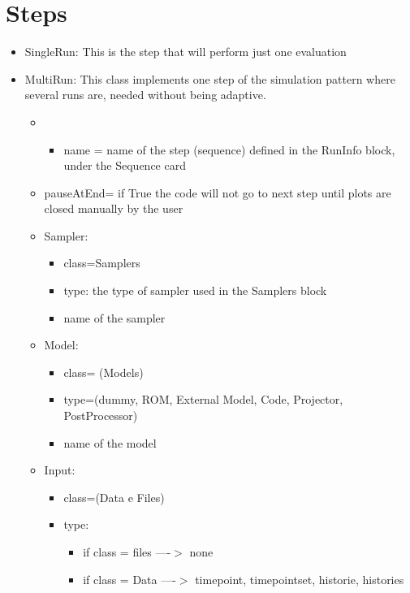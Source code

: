 \section{Steps  \\ \vspace{2 mm} {\small }}
\label{sec:steps}

\begin{itemize}
\item SingleRun: This is the step that will perform just one evaluation
\item MultiRun: This class implements one step of the simulation pattern where several runs are, needed without being adaptive.  
\begin{itemize}
\item
	\begin{itemize}
	\item name = name of the step (sequence) defined in the RunInfo block, under the Sequence card
	\end{itemize}
\item pauseAtEnd= if True the code will not go to next step until plots are closed manually by the user
\end{itemize}
\begin{itemize}
\item Sampler: 
\begin {itemize}
\item class=Samplers 
\item type: the type of sampler used in the Samplers block 
\item name of the sampler
\end{itemize}
\item Model: 
\begin{itemize}
\item class= (Models) 
\item type=(dummy, ROM, External Model, Code, Projector, PostProcessor) 
\item name of the model
\end{itemize}
\item Input:  
\begin{itemize}
\item class=(Data e Files)
\item type:
\begin{itemize}
\item if class = files ----$>$ none
\item if class = Data  ----$>$ timepoint, timepointset, historie, histories

\end{itemize}
\end{itemize}
\end{itemize}
\end{itemize}
